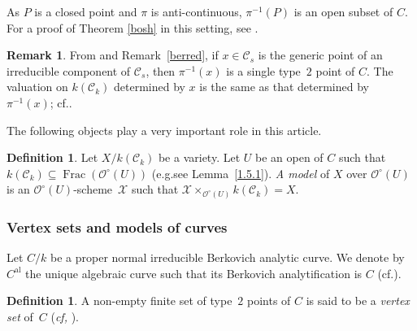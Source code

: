 \documentclass[10pt]{amsart}
\newcommand{\eg}{e.g.}
\newcommand{\cf}{cf.}
\newcommand{\al}{\mathrm{al}}
\DeclareMathOperator{\Frac}{Frac}
\theoremstyle{definition}
\newtheorem{defn}[thm]{Definition}
\newtheorem{rem}[thm]{Remark}
\begin{document}
As $P$ is a closed point and $\pi$ is anti-continuous, $\pi^{-1}(P)$ is an open subset of $C$. For a proof of Theorem \ref{bosh} in this setting, see \cite[Prop.\,4.5]{une}.

\begin{rem} \label{0.2}
From \cite[Prop.\,2.4.4]{Ber90} and Remark~\ref{berred}, if $x \in \mathscr{C}_s$ is the generic point of an irreducible component of $\mathscr{C}_s$, then $\pi^{-1}(x)$ is a single type~$2$ point of $C$. The valuation on $k(\mathscr{C}_k)$ determined by $x$ is the same as that determined by $\pi^{-1}(x)$; \cf \cite[Lem.\,4.3]{une}.
\end{rem}

\pagebreak[2]
The following objects play a very important role in this article.

\begin{defn} \label{modO}
Let $X/k(\mathscr{C}_k)$ be a variety.
Let $U$ be an open of $C$ such that $k(\mathscr{C}_k) \subseteq \Frac(\mathcal{O}^{\circ}(U))$ (\eg see Lemma~\ref{1.5.1}). \emph{A model} of $X$ over $\mathcal{O}^{\circ}(U)$ is an $\mathcal{O}^{\circ}(U)$-scheme~$\mathcal{X}$ such that ${\mathcal{X} \times_{\mathcal{O}^{\circ}(U)} k(\mathscr{C}_k)=X}$.
\end{defn}

\subsubsection{Vertex sets and models of curves}

Let $C/k$ be a proper normal irreducible Berkovich analytic curve. We denote by $C^{\al}$ the unique algebraic curve such that its Berkovich analytification is $C$ (\cf \cite[Th.\,3.7.2]{duc}).

\begin{defn} \label{virtuals} A non-empty finite set of type~$2$ points of $C$ is said to be a \emph{vertex set} of~$C$ (\emph{cf,} \cite[6.3.17]{duc}).
\end{defn}
\end{document}
